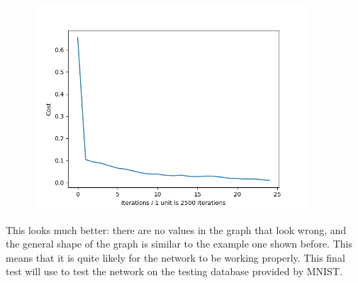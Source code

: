 \documentclass{report}
\begin{document}
\begin{figure}[H]
    \centering
    \includegraphics[width = 4in]{Images/Development and Testing/Stage 3/Training Curve.png} 
    \label{fig:Good Cost Graph}
\end{figure}
\noindent This looks much better: there are no values in the graph that look wrong, and the general shape of the graph is similar to the example one shown before. This means that it is quite likely for the network to be working properly. This final test will use  to test the network on the testing database provided by MNIST.
\end{document}
